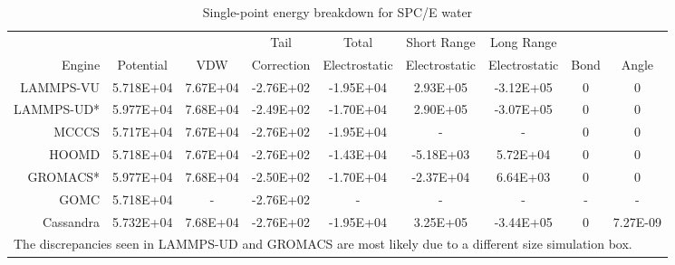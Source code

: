 \begin{landscape}
\begin{table}[h!]
\caption{Single-point energy breakdown for SPC/E water}\label{tab:sp_water}
\begin{tabular}{rcccccccc}
\hline
& & & Tail & Total & Short Range & Long Range & & \\
Engine & Potential & VDW & Correction & Electrostatic & Electrostatic & Electrostatic & Bond & Angle \\
\hline
LAMMPS-VU & 5.718E+04 & 7.67E+04 & -2.76E+02 & -1.95E+04 & 2.93E+05 & -3.12E+05 & 0 & 0 \\
LAMMPS-UD* & 5.977E+04 & 7.68E+04 & -2.49E+02 & -1.70E+04 & 2.90E+05 & -3.07E+05 & 0 & 0 \\
MCCCS & 5.717E+04 & 7.67E+04 & -2.76E+02 & -1.95E+04 & - & - & 0 & 0 \\
HOOMD & 5.718E+04 & 7.67E+04 & -2.76E+02 & -1.43E+04 & -5.18E+03 & 5.72E+04 & 0 & 0 \\
GROMACS* & 5.977E+04 & 7.68E+04 & -2.50E+02 & -1.70E+04 & -2.37E+04 & 6.64E+03 & 0 & 0 \\
GOMC & 5.718E+04 & - & -2.76E+02 & - & - & - & - & - \\
Cassandra & 5.732E+04 & 7.68E+04 & -2.76E+02 & -1.95E+04 & 3.25E+05 & -3.44E+05 & 0 & 7.27E-09 \\ \hline
\multicolumn{9}{l}{\small *The discrepancies seen in LAMMPS-UD and GROMACS are most likely due to a different size simulation box.} \\
\end{tabular}
\end{table}


\end{landscape}

